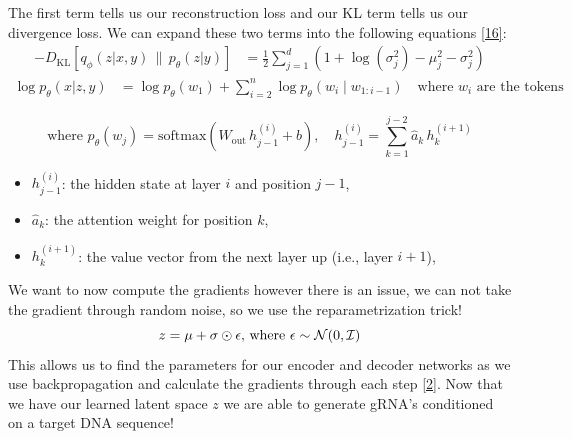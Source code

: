 \documentclass{article}
\begin{document}
The first term tells us our reconstruction loss and our KL term tells us our divergence loss. We can expand these two terms into the following equations \hyperref[Reference 16]{[16]}:
\begin{align}
  - D_{\text{KL}} \left[q_\phi(z|x,y) \,\|\, p_\theta(z|y)\right] & = \frac{1}{2} \sum_{j=1}^{d} \left( 1 + \log(\sigma_j^2) - \mu_j^2 - \sigma_j^2 \right)
  \end{align}
  \begin{align}
  \log p_\theta(x|z,y) & = \log p_\theta(w_1) + \sum_{i=2}^{n} \log p_\theta(w_i \mid w_{1:i-1}) \quad \text{where } w_i \text{ are the tokens}
  \end{align}
  

\vspace{-1em}
\[
\text{where } p_\theta(w_j) = \text{softmax}(W_{\text{out}} \, h^{(i)}_{j-1} + b), \quad h^{(i)}_{j-1} = \sum_{k=1}^{j-2} \hat{a}_k \, h_k^{(i+1)}
\]


\small
\vspace{-1em}

\begin{itemize}
  \item $h^{(i)}_{j-1}$: the hidden state at layer $i$ and position $j - 1$,
  \item $\hat{a}_k$: the attention weight for position $k$,
  \item $h^{(i+1)}_k$: the value vector from the next layer up (i.e., layer $i + 1$),
\end{itemize}


We want to now compute the gradients however there is an issue, we can not take the gradient through random noise, so we use the reparametrization trick!
\[
z = \mu + \sigma \odot \epsilon \text{, where \@} \epsilon \sim \mathcal{N}(0, \mathcal{I})
\]
This allows us to find the parameters for our encoder and decoder networks as we use backpropagation and calculate the gradients through each step \hyperref[Reference 2]{[2]}. Now that we have our learned latent space $z$ we are able to generate gRNA's conditioned on a target DNA sequence!
\end{document}
